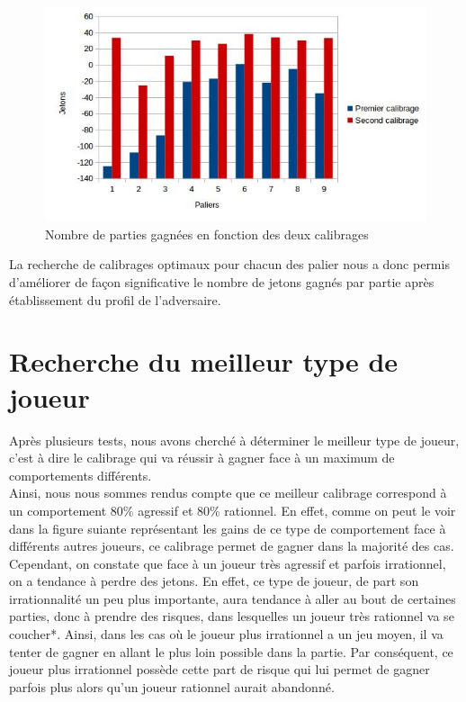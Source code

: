 \documentclass{report}
\begin{document}
\begin{figure}[H]
	\begin{center}
		\includegraphics[scale=0.5]{./imagesRapport/JetonsGagnesEnFonctionCalibrage.jpg}
	\end{center}
	\caption{Nombre de parties gagnées en fonction des deux calibrages}
\end{figure}

La recherche de calibrages optimaux pour chacun des palier nous a donc permis d'améliorer de façon significative le nombre de jetons gagnés par partie après établissement du profil de l'adversaire.

\section{Recherche du meilleur type de joueur}
\hspace{0.5cm}Après plusieurs tests, nous avons cherché à déterminer le meilleur type de joueur, c'est à dire le calibrage qui va réussir à gagner face à un maximum de comportements différents.\\

Ainsi, nous nous sommes rendus compte que ce meilleur calibrage correspond à un comportement 80\% agressif et 80\% rationnel. En effet, comme on peut le voir dans la figure suiante représentant les gains de ce type de comportement face à différents autres joueurs, ce calibrage permet de gagner dans la majorité des cas. Cependant, on constate que face à un joueur très agressif et parfois irrationnel, on a tendance à perdre des jetons. En effet, ce type de joueur, de part son irrationnalité un peu plus importante, aura tendance à aller au bout de certaines parties, donc à prendre des risques, dans lesquelles un joueur très rationnel va se coucher*. Ainsi, dans les cas où le joueur plus irrationnel a un jeu moyen, il va tenter de gagner en allant le plus loin possible dans la partie. Par conséquent, ce joueur plus irrationnel possède cette part de risque qui lui permet de gagner parfois plus alors qu'un joueur rationnel aurait abandonné.\\
\end{document}
